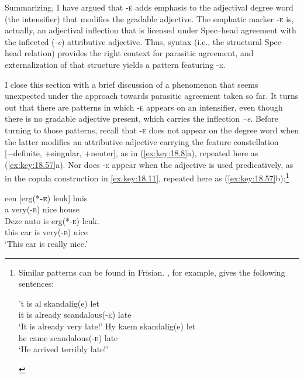 \documentclass[output=paper]{langsci/langscibook}
\begin{document}
Summarizing, I have argued that \textsc{-e} adds emphasis to the adjectival
degree word (the intensifier) that modifies the      gradable adjective. The
emphatic marker \textsc{-e} is, actually, an adjectival inflection that is
licensed under Spec--head agreement with the inflected (\emph{-e}) attributive
adjective. Thus, syntax (i.e., the structural Spec-head relation) provides the
right context for parasitic agreement, and externalization of that structure
yields a pattern featuring \textsc{-e}.

I close this section with a brief discussion of a phenomenon that seems
unexpected under the approach towards parasitic agreement taken so far. It
turns out that there are patterns in which \textsc{-e} appears on an
intensifier, even though there is no gradable adjective present, which carries
the inflection \emph{–e}. Before turning to those patterns, recall that
\textsc{-e} does not appear on the degree word when the latter modifies an
attributive adjective carrying the feature constellation [−definite, +singular,
+neuter], as in (\ref{ex:key:18.8}a), repeated here as (\ref{ex:key:18.57}a). Nor does
\textsc{-e} appear when the adjective is used predicatively, as in the
copula
construction in \eqref{ex:key:18.11}, repeated here as
(\ref{ex:key:18.57}b):\footnote{Similar patterns can be found in Frisian.
    \citet{Verdenius1939}, for example, gives the following sentences:

\begin{exe}
    \sn
	\gll 't is al skandalig(e) let\\
		it is already scandalous(\textsc{-e}) late\\
	\glt \enquote*{It is already very late!}
    \sn
	\gll Hy kaem skandalig(e) let\\
		he came scandalous(\textsc{-e}) late\\
	\glt \enquote*{He arrived terribly late!}
\end{exe}\label{fn:18.16}}

\ea%
    \label{ex:key:18.57}
	\ea
	\gll  een    [erg(*\textbf{\textsc{-e}})    leuk]  huis\\
		a          very(\textsc{-e})    nice    house\\
	\ex
	\gll Deze  auto    is    erg(*\textsc{-e})  leuk.\\
		this    car      is    very(\textsc{-e})    nice\\
	\glt \enquote*{This car is really nice.}
	\z
\z\newpage
\end{document}
